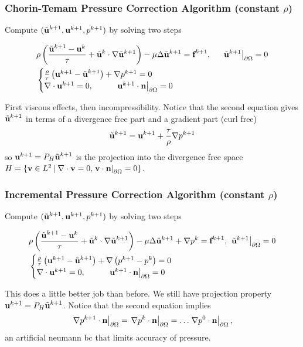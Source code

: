 \documentclass{beamer}
\begin{document}
\begin{frame}
  \frametitle{Chorin-Temam Pressure Correction Algorithm (constant $\rho$)}
  Compute $(\tilde{\textbf{u}}^{k+1}, \textbf{u}^{k+1}, p^{k+1})$ by solving two steps
  \begin{block}{}
    \begin{align*}
    &\rho\left( \frac{\tilde{\textbf{u}}^{k+1} - \textbf{u}^{k}}{\tau}  + \tilde{\textbf{u}}^{k}\cdot\nabla\tilde{\textbf{u}}^{k+1}\right) - \mu\Delta \tilde{\textbf{u}}^{k+1} = \textbf{f}^{k+1},  \hspace{0.5cm} \left.\tilde{\textbf{u}}^{k+1}\right|_{\partial\Omega}=0\\
    &\begin{cases}
      \frac{\rho}{\tau}\left( \textbf{u}^{k+1} - \tilde{\textbf{u}}^{k+1}\right) + \nabla p^{k+1}= 0\\
      \nabla\cdot \textbf{u}^{k+1} = 0,\hspace{1cm}  \left.\textbf{u}^{k+1}\cdot\textbf{n}\right|_{\partial\Omega} = 0 
    \end{cases}
    \end{align*}
  \end{block}
  First viscous effects,  then incompressibility.  Notice that the second equation gives $\tilde{\textbf{u}}^{k+1}$ in terms of a divergence free part and a gradient part (curl free)
  \begin{equation}
    \tilde{\textbf{u}}^{k+1} = \textbf{u}^{k+1} + \frac{\tau}{\rho} \nabla p^{k+1}
  \end{equation}
  so $\textbf{u}^{k+1} = P_H \tilde{\textbf{u}}^{k+1}$ is the projection into the divergence free space $H=\{ \textbf{v}\in L^2 \:|\: \nabla\cdot\textbf{v} = 0,  \left.\textbf{v}\cdot\textbf{n}\right|_{\partial\Omega}=0 \}$.
  
\end{frame}


\begin{frame}
  \frametitle{Incremental Pressure Correction Algorithm (constant $\rho$)}
  Compute $(\tilde{\textbf{u}}^{k+1}, \textbf{u}^{k+1}, p^{k+1})$ by solving two steps
  \begin{block}{}
    \begin{align*}
    &\rho\left( \frac{\tilde{\textbf{u}}^{k+1} - \textbf{u}^{k}}{\tau}  + \tilde{\textbf{u}}^{k}\cdot\nabla\tilde{\textbf{u}}^{k+1}\right) - \mu\Delta \tilde{\textbf{u}}^{k+1} + \nabla p^{k} = \textbf{f}^{k+1},  \hspace{0.1cm} \left.\tilde{\textbf{u}}^{k+1}\right|_{\partial\Omega}=0\\
    &\begin{cases}
      \frac{\rho}{\tau}\left( \textbf{u}^{k+1} - \tilde{\textbf{u}}^{k+1}\right) + \nabla \left(p^{k+1}-p^{k}\right)= 0\\
      \nabla\cdot \textbf{u}^{k+1} = 0,\hspace{1cm}  \left.\textbf{u}^{k+1}\cdot\textbf{n}\right|_{\partial\Omega} = 0 
    \end{cases}
    \end{align*}
  \end{block}
  This does a little better job than before.  We still have projection property $\textbf{u}^{k+1} = P_H \tilde{\textbf{u}}^{k+1}$.  Notice that the second equation implies \[\left.\nabla p^{k+1}\cdot\textbf{n}\right|_{\partial\Omega} = \left.\nabla p^{k}\cdot\textbf{n}\right|_{\partial\Omega} = \dots \left.\nabla p^{0}\cdot\textbf{n}\right|_{\partial\Omega},\]
  an artificial neumann bc that limits accuracy of pressure.
\end{frame}
\end{document}
